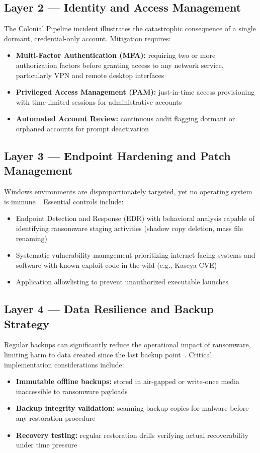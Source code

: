 \documentclass[sigconf,nonacm]{acmart}
\begin{document}
\subsection{Layer 2 — Identity and Access Management}

The Colonial Pipeline incident illustrates the catastrophic consequence of a single
dormant, credential-only account. Mitigation requires:
\begin{itemize}
  \item \textbf{Multi-Factor Authentication (MFA):} requiring two or more authorization
        factors before granting access to any network service, particularly VPN and
        remote desktop interfaces~\cite{saeed2020}
  \item \textbf{Privileged Access Management (PAM):} just-in-time access provisioning
        with time-limited sessions for administrative accounts
  \item \textbf{Automated Account Review:} continuous audit flagging dormant or
        orphaned accounts for prompt deactivation
\end{itemize}

\subsection{Layer 3 — Endpoint Hardening and Patch Management}

Windows environments are disproportionately targeted, yet no operating system is
immune~\cite{sultan2018}. Essential controls include:
\begin{itemize}
  \item Endpoint Detection and Response (EDR) with behavioral analysis capable of
        identifying ransomware staging activities (shadow copy deletion, mass file
        renaming)
  \item Systematic vulnerability management prioritizing internet-facing systems and
        software with known exploit code in the wild (e.g., Kaseya CVE)
  \item Application allowlisting to prevent unauthorized executable launches
\end{itemize}

\subsection{Layer 4 — Data Resilience and Backup Strategy}

Regular backups can significantly reduce the operational impact of ransomware, limiting
harm to data created since the last backup point~\cite{cleary2023}. Critical
implementation considerations include:
\begin{itemize}
  \item \textbf{Immutable offline backups:} stored in air-gapped or write-once media
        inaccessible to ransomware payloads
  \item \textbf{Backup integrity validation:} scanning backup copies for malware before
        any restoration procedure
  \item \textbf{Recovery testing:} regular restoration drills verifying actual
        recoverability under time pressure
\end{itemize}
\end{document}
